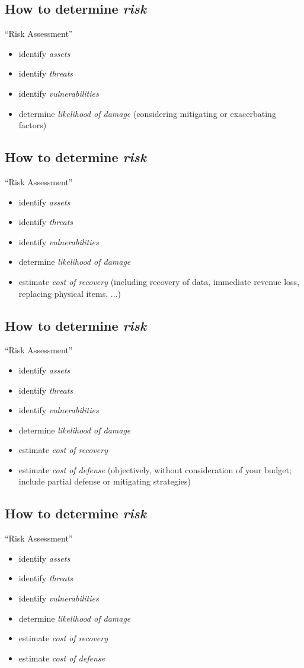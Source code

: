 \documentclass[xga]{xdvislides}
\begin{document}
\subsection{How to determine {\em risk}}
``Risk Assessment''
\begin{itemize}
	\item identify {\em assets}
	\item identify {\em threats}
	\item identify {\em vulnerabilities}
	\item determine {\em likelihood of damage} (considering mitigating or exacerbating factors)
\end{itemize}

\subsection{How to determine {\em risk}}
``Risk Assessment''
\begin{itemize}
	\item identify {\em assets}
	\item identify {\em threats}
	\item identify {\em vulnerabilities}
	\item determine {\em likelihood of damage}
	\item estimate {\em cost of recovery} (including recovery of data, immediate revenue loss, replacing physical items, ...)
\end{itemize}

\subsection{How to determine {\em risk}}
``Risk Assessment''
\begin{itemize}
	\item identify {\em assets}
	\item identify {\em threats}
	\item identify {\em vulnerabilities}
	\item determine {\em likelihood of damage}
	\item estimate {\em cost of recovery}
	\item estimate {\em cost of defense} (objectively, without consideration of your budget; include partial defense or mitigating strategies)
\end{itemize}

\subsection{How to determine {\em risk}}
``Risk Assessment''
\begin{itemize}
	\item identify {\em assets}
	\item identify {\em threats}
	\item identify {\em vulnerabilities}
	\item determine {\em likelihood of damage}
	\item estimate {\em cost of recovery}
	\item estimate {\em cost of defense}
\end{itemize}
\vspace{.5in}
\end{document}
